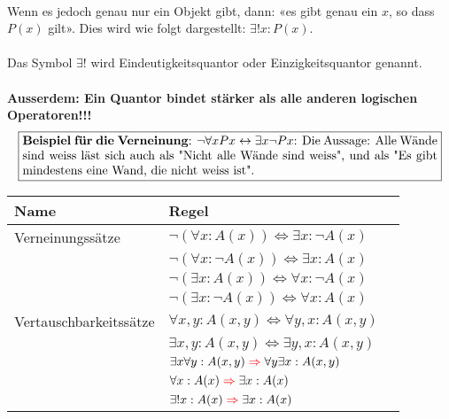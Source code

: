 \documentclass[../gruppenarbeit_1.tex]{subfiles}
\begin{document}
    \\Wenn es jedoch genau nur ein Objekt gibt, dann: «es gibt genau ein $x$, so dass $P(x)$ gilt». Dies wird wie folgt dargestellt: $\exists! x:P(x)$.
    \\
    \\Das Symbol $\exists!$ wird Eindeutigkeitsquantor oder Einzigkeitsquantor genannt.
    \\
    \\\textbf{Ausserdem: Ein Quantor bindet stärker als alle anderen logischen Operatoren!!!}
    \\
    \begin{align}
        \fbox{\begin{minipage}{11.8cm}
                  \textbf{Beispiel für die Verneinung}: $\neg \forall xPx\leftrightarrow \exists x\neg Px$: Die Aussage: Alle Wände sind weiss läst sich auch als "Nicht alle Wände sind weiss", und als "Es gibt mindestens eine Wand, die nicht weiss ist".
        \end{minipage}}
    \end{align}
    \def\arraystretch{1.5}
    \begin{table}[ht]
        \begin{tabular}[t]{lll}
            \hline
            Name & Regel\\
            \hline
            Verneinungssätze & $\neg(\forall x : A(x)) \iff \exists x : \neg A(x)$\\
            & $\neg(\forall x : \neg A(x)) \iff \exists x : A(x)$\\
            & $\neg(\exists x : A(x)) \iff \forall x : \neg A(x)$\\
            & $\neg(\exists x : \neg A(x)) \iff \forall x : A(x)$\\
            Vertauschbarkeitssätze & $\forall x, y : A(x, y) \iff \forall y, x : A(x, y)$\\
            & $\exists x, y : A(x, y) \iff \exists y, x : A(x, y)$\\
            & $\exists x \forall y : A(x, y) \color{red}\Rightarrow \color{black}\forall y \exists x : A(x, y)$\\
            & $\forall x : A(x) \color{red}\Rightarrow \color{black}\exists x : A(x)$\\
            & $\exists! x : A(x) \color{red}\Rightarrow \color{black}\exists x : A(x)$\\
            \hline
        \end{tabular}
    \end{table}
\end{document}
